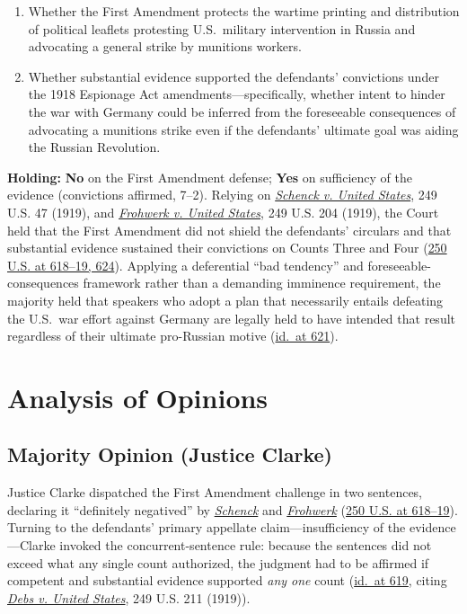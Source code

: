 \documentclass[12pt]{article}
\begin{document}
\begin{enumerate}
  \item Whether the First Amendment protects the wartime printing and distribution of political leaflets protesting U.S.\ military intervention in Russia and advocating a general strike by munitions workers.
  \item Whether substantial evidence supported the defendants' convictions under the 1918 Espionage Act amendments---specifically, whether intent to hinder the war with Germany could be inferred from the foreseeable consequences of advocating a munitions strike even if the defendants' ultimate goal was aiding the Russian Revolution.
\end{enumerate}

\textbf{Holding:} \textbf{No} on the First Amendment defense; \textbf{Yes} on sufficiency of the evidence (convictions affirmed, 7--2). Relying on \href{https://supreme.justia.com/cases/federal/us/249/47/}{\emph{Schenck v. United States}}, 249 U.S. 47 (1919), and \href{https://supreme.justia.com/cases/federal/us/249/204/}{\emph{Frohwerk v. United States}}, 249 U.S. 204 (1919), the Court held that the First Amendment did not shield the defendants' circulars and that substantial evidence sustained their convictions on Counts Three and Four (\href{https://supreme.justia.com/cases/federal/us/250/616/}{250 U.S. at 618--19, 624}). Applying a deferential ``bad tendency'' and foreseeable-consequences framework rather than a demanding imminence requirement, the majority held that speakers who adopt a plan that necessarily entails defeating the U.S.\ war effort against Germany are legally held to have intended that result regardless of their ultimate pro-Russian motive (\href{https://supreme.justia.com/cases/federal/us/250/616/}{id.\ at 621}).

\section{Analysis of Opinions}
\subsection{Majority Opinion (Justice Clarke)}

Justice Clarke dispatched the First Amendment challenge in two sentences, declaring it ``definitely negatived'' by \href{https://supreme.justia.com/cases/federal/us/249/47/}{\emph{Schenck}} and \href{https://supreme.justia.com/cases/federal/us/249/204/}{\emph{Frohwerk}} (\href{https://supreme.justia.com/cases/federal/us/250/616/}{250 U.S. at 618--19}). Turning to the defendants' primary appellate claim---insufficiency of the evidence---Clarke invoked the concurrent-sentence rule: because the sentences did not exceed what any single count authorized, the judgment had to be affirmed if competent and substantial evidence supported \emph{any one} count (\href{https://supreme.justia.com/cases/federal/us/250/616/}{id.\ at 619}, citing \href{https://supreme.justia.com/cases/federal/us/249/211/}{\emph{Debs v. United States}}, 249 U.S. 211 (1919)).
\end{document}
